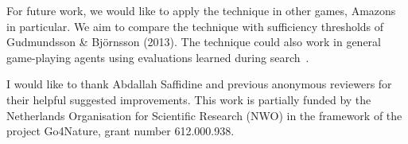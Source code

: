 \documentclass[conference]{IEEEtran}
\begin{document}
For future work, we would like to apply the technique in other games, Amazons in 
particular. 
We aim to compare the technique with sufficiency thresholds 
of Gudmundsson \& Bj\"{o}rnsson (2013). 
The technique could also work in general game-playing agents using 
evaluations learned during search~\cite{Finnsson10Learning}.

 I would like to thank Abdallah Saffidine and previous anonymous reviewers for their 
helpful suggested improvements. This work is partially funded by the Netherlands 
Organisation for Scientific Research (NWO) in the framework of the project Go4Nature, grant number 612.000.938. 


%

%


\end{document}
